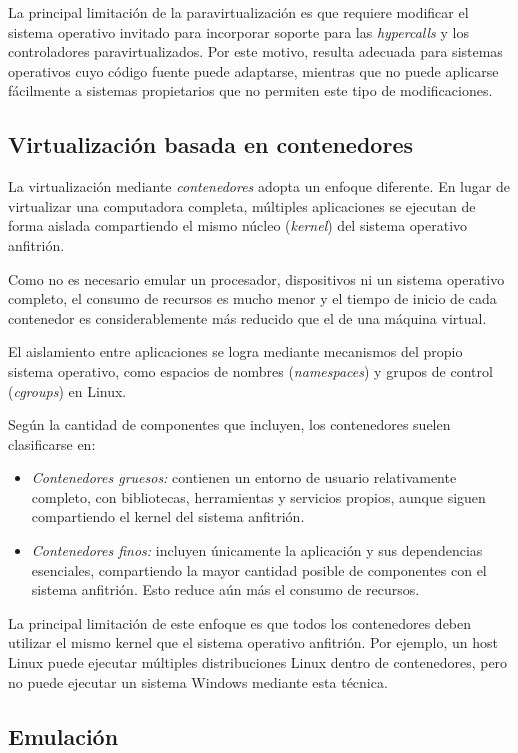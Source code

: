 La principal limitación de la paravirtualización es que requiere modificar el sistema operativo invitado para incorporar soporte para las \textit{hypercalls} y los controladores paravirtualizados. Por este motivo, resulta adecuada para sistemas operativos cuyo código fuente puede adaptarse, mientras que no puede aplicarse fácilmente a sistemas propietarios que no permiten este tipo de modificaciones.

\subsection{Virtualización basada en contenedores}

La virtualización mediante \textit{contenedores} adopta un enfoque diferente. En lugar de virtualizar una computadora completa, múltiples aplicaciones se ejecutan de forma aislada compartiendo el mismo núcleo (\textit{kernel}) del sistema operativo anfitrión.

Como no es necesario emular un procesador, dispositivos ni un sistema operativo completo, el consumo de recursos es mucho menor y el tiempo de inicio de cada contenedor es considerablemente más reducido que el de una máquina virtual.

El aislamiento entre aplicaciones se logra mediante mecanismos del propio sistema operativo, como espacios de nombres (\textit{namespaces}) y grupos de control (\textit{cgroups}) en Linux.

Según la cantidad de componentes que incluyen, los contenedores suelen clasificarse en:
\begin{itemize}
  \item \textit{Contenedores gruesos:} contienen un entorno de usuario relativamente completo, con bibliotecas, herramientas y servicios propios, aunque siguen compartiendo el kernel del sistema anfitrión.
  \item \textit{Contenedores finos:} incluyen únicamente la aplicación y sus dependencias esenciales, compartiendo la mayor cantidad posible de componentes con el sistema anfitrión. Esto reduce aún más el consumo de recursos.
\end{itemize}
La principal limitación de este enfoque es que todos los contenedores deben utilizar el mismo kernel que el sistema operativo anfitrión. Por ejemplo, un host Linux puede ejecutar múltiples distribuciones Linux dentro de contenedores, pero no puede ejecutar un sistema Windows mediante esta técnica.

\subsection{Emulación}

